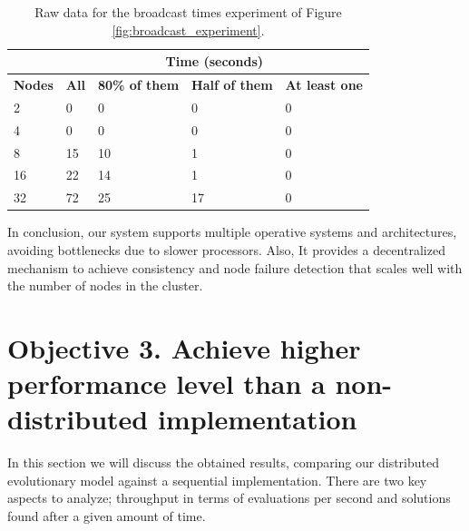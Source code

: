 \begin{table}[h!]
\centering
\begin{tabular}{l|l|l|l|l}
\cline{2-5}
                                     & \multicolumn{4}{c|}{\textbf{Time (seconds)}}                                                            \\ \hline
\multicolumn{1}{|l|}{\textbf{Nodes}} & \textbf{All} & \textbf{80\% of them} & \textbf{Half of them} & \multicolumn{1}{r|}{\textbf{At least one}} \\ \hline
\multicolumn{1}{|l|}{2}              & 0            & 0                    & 0                     & \multicolumn{1}{l|}{0}                    \\ \hline
\multicolumn{1}{|l|}{4}              & 0            & 0                    & 0                     & \multicolumn{1}{l|}{0}                    \\ \hline
\multicolumn{1}{|l|}{8}              & 15           & 10                   & 1                     & \multicolumn{1}{l|}{0}                    \\ \hline
\multicolumn{1}{|l|}{16}             & 22           & 14                   & 1                     & \multicolumn{1}{l|}{0}                    \\ \hline
\multicolumn{1}{|l|}{32}             & 72           & 25                   & 17                    & \multicolumn{1}{l|}{0}                    \\ \hline
\end{tabular}
\caption{Raw data for the broadcast times experiment of Figure \ref{fig:broadcast_experiment}.}
\label{tab:boadcast_experiment}
\end{table}

In conclusion, our system supports multiple operative systems and architectures, avoiding bottlenecks due to slower processors. Also, It provides a decentralized mechanism to achieve consistency and node failure detection that scales well with the number of nodes in the cluster.


\section{Objective 3. Achieve higher performance level than a non-distributed implementation}

In this section we will discuss the obtained results, comparing our distributed evolutionary model against a sequential implementation. There are two key aspects to analyze; throughput in terms of evaluations per second and solutions found after a given amount of time.

